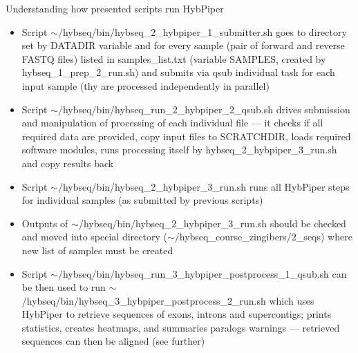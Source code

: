 \documentclass[compress,  xelatex, 11pt, xcolor=x11names, aspectratio=169,
	hyperref={
		bookmarks=true,
		unicode=true,
		colorlinks=true,
		pdftitle={HybSeq course},
		plainpages=false,
		pdfauthor={Vojtech Zeisek},
		pdfsubject={Practical processing of HybSeq target enrichment sequencing data on computing grids like MetaCentrum},
		pdfcreator={XeLaTeX},
		pdfkeywords={BASH, command line, GNU, HybSeq, Linux, MetaCentrum, sequencing shell, target enrichment},
		linkcolor=Turquoise4, %
		anchorcolor=DodgerBlue4, %
		citecolor=DodgerBlue4, %
		filecolor=DodgerBlue4, %
		menucolor=Tan4, %
		urlcolor=DarkOliveGreen4 %
		},
	url={hyphens, lowtilde} %
	]{beamer}
\renewcommand{\texttt}[1]{\colorbox{Cornsilk2}{{\ttfamily #1}}}
\begin{document}
\begin{frame}[allowframebreaks]{Understanding how presented scripts run HybPiper}
	\begin{itemize}
		\item Script \texttt{$\sim$/hybseq/bin/hybseq\_2\_hybpiper\_1\_submitter.sh} goes to directory set by \texttt{DATADIR} variable and for every sample (pair of forward and reverse FASTQ files) listed in \texttt{samples\_list.txt} (variable \texttt{SAMPLES}, created by \texttt{hybseq\_1\_prep\_2\_run.sh}) and submits via \texttt{qsub} individual task for each input sample (thy are processed independently in parallel)
		\item Script \texttt{$\sim$/hybseq/bin/hybseq\_run\_2\_hybpiper\_2\_qsub.sh} drives submission and manipulation of processing of each individual file --- it checks if all required data are provided, copy input files to \texttt{SCRATCHDIR}, loads required software modules, runs processing itself by \texttt{hybseq\_2\_hybpiper\_3\_run.sh} and copy results back
		\item Script \texttt{$\sim$/hybseq/bin/hybseq\_2\_hybpiper\_3\_run.sh} runs all HybPiper steps for individual samples (as submitted by previous scripts)
		\item Outputs of \texttt{$\sim$/hybseq/bin/hybseq\_2\_hybpiper\_3\_run.sh} should be checked and moved into special directory (\texttt{$\sim$/hybseq\_course\_zingibers/2\_seqs}) where new list of samples must be created
		\item Script \texttt{$\sim$/hybseq/bin/hybseq\_run\_3\_hybpiper\_postprocess\_1\_qsub.sh} can be then used to run \texttt{$\sim$/hybseq/bin/hybseq\_3\_hybpiper\_postprocess\_2\_run.sh} which uses HybPiper to retrieve sequences of exons, introns and supercontigs; prints statistics, creates heatmaps, and summaries paralogs warnings --- retrieved sequences can then be aligned (see further)
	\end{itemize}
\end{frame}
\end{document}
